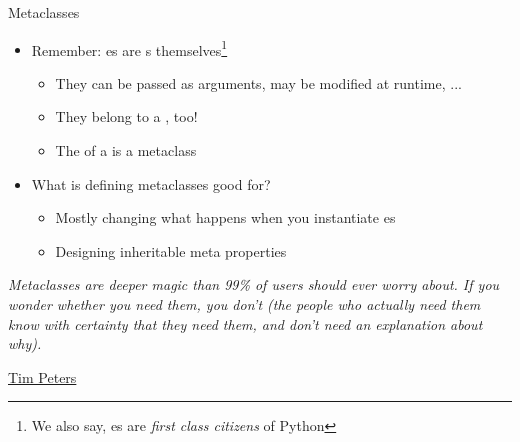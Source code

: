 \begin{frame}{Metaclasses}
%
\begin{itemize}
\item Remember: es are s themselves\footnote{%
		We also say, es are \emph{first class citizens} of Python}
	\begin{itemize}
	\item They can be passed as arguments, may be modified at runtime, ...
	\item They belong to a , too!
	\item[\Thus] The  of a  is a metaclass
	\end{itemize}
\item What is defining metaclasses good for?
	\begin{itemize}
	\item Mostly changing what happens when you instantiate es
	\item Designing inheritable meta properties
	\end{itemize}
\end{itemize}
%
\begin{defbox}[Quote]
\footnotesize
\emph{Metaclasses are deeper magic than 99\% of users should ever worry about.
If you wonder whether you need them, you don’t 
(the people who actually need them know with certainty that they need them, and don’t need an explanation about why).}
\begin{flushright}
\color{blue} \href{https://en.wikipedia.org/wiki/Tim_Peters_(software_engineer)}{Tim Peters}
\end{flushright}
\end{defbox}
%
\end{frame}


